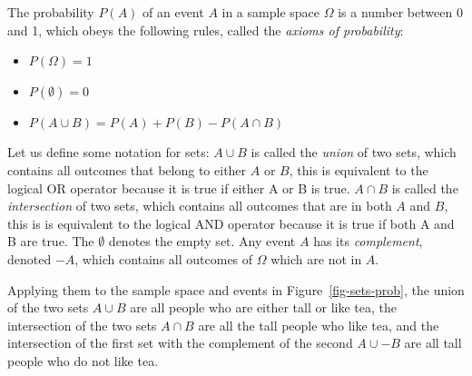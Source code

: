 \documentclass[
  letterpaper,
  DIV=11,
  numbers=noendperiod]{scrreprt}
\providecommand{\tightlist}{%
  \setlength{\itemsep}{0pt}\setlength{\parskip}{0pt}}\usepackage{longtable,booktabs,array}
\begin{document}
\begin{tcolorbox}[enhanced jigsaw, arc=.35mm, colframe=quarto-callout-note-color-frame, left=2mm, opacitybacktitle=0.6, breakable, title=\textcolor{quarto-callout-note-color}{\faInfo}\hspace{0.5em}{Definition}, toprule=.15mm, coltitle=black, bottomtitle=1mm, toptitle=1mm, colback=white, leftrule=.75mm, colbacktitle=quarto-callout-note-color!10!white, titlerule=0mm, opacityback=0, rightrule=.15mm, bottomrule=.15mm]

The probability \(P(A)\) of an event \(A\) in a sample space \(\Omega\)
is a number between 0 and 1, which obeys the following rules, called the
\emph{axioms of probability}:

\begin{itemize}
\tightlist
\item
  \(P(\Omega) = 1\)
\item
  \(P(\emptyset) = 0\)
\item
  \(P(A \cup B) = P(A) + P(B) - P(A \cap B)\)
\end{itemize}

\end{tcolorbox}

Let us define some notation for sets: \(A \cup B\) is called the
\emph{union} of two sets, which contains all outcomes that belong to
either \(A\) or \(B\), this is equivalent to the logical OR operator
because it is true if either A or B is true. \(A\cap B\) is called the
\emph{intersection} of two sets, which contains all outcomes that are in
both \(A\) and \(B\), this is is equivalent to the logical AND operator
because it is true if both A and B are true. The \(\emptyset\) denotes
the empty set. Any event \(A\) has its \emph{complement}, denoted
\(-A\), which contains all outcomes of \(\Omega\) which are not in
\(A\).

Applying them to the sample space and events in
Figure~\ref{fig-sets-prob}, the union of the two sets \(A \cup B\) are
all people who are either tall or like tea, the intersection of the two
sets \(A\cap B\) are all the tall people who like tea, and the
intersection of the first set with the complement of the second
\(A \cup - B\) are all tall people who do not like tea.
\end{document}
